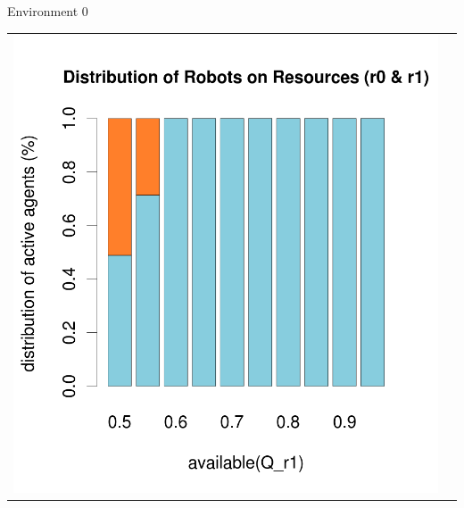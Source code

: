 \documentclass[8pt, handout=show,notes=show]{beamer}
\begin{document}
\begin{frame}{Environment 0}
\begin{table}[H]
\begin{tabular}{cc}
\newline
\includegraphics[width=\imgSize]{../images/5StaticEnv/barplotAliveR1AndR2_median_env0_normalized}\\
\end{tabular}
\end{table}
\end{frame}
\end{document}
